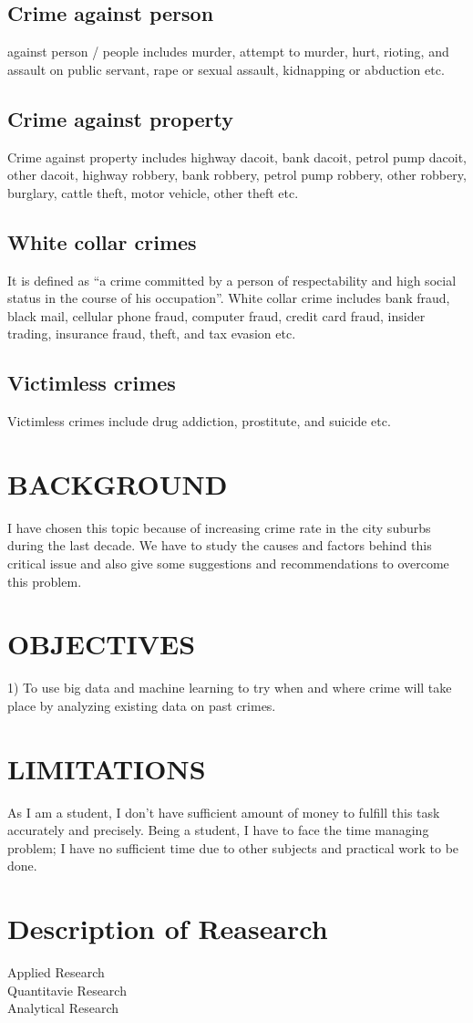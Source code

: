 \documentclass{article}
\begin{document}
\subsection {Crime against person}
against person / people includes murder, attempt to murder, hurt, rioting, and assault on public servant, rape or sexual assault, kidnapping or abduction etc. 
 
\subsection {Crime against property}
Crime against property includes highway dacoit, bank dacoit, petrol pump dacoit, other dacoit, highway robbery, bank robbery, petrol pump robbery, other robbery, burglary, cattle theft, motor vehicle, other theft etc. 
 
\subsection {White collar crimes} 
It is defined as “a crime committed by a person of respectability and high social status in the course 
of his occupation”. 
  White collar crime includes bank fraud, black mail, cellular phone fraud, computer fraud, credit card fraud, insider trading, insurance fraud, theft, and tax evasion etc. 

\subsection {Victimless crimes}
Victimless crimes include drug addiction, prostitute, and suicide etc. 


\section{BACKGROUND} 
I have chosen this topic because of increasing crime rate in the city suburbs during the last decade. We have to study the causes and factors behind this critical issue and also give some suggestions and recommendations to overcome this problem.

\section{OBJECTIVES}
1)	To use big data and machine learning to try when and where crime will take place by analyzing existing data on past crimes.


\section{LIMITATIONS}
As I am a student, I don’t have sufficient amount of money to fulfill this task accurately and precisely. Being a student, I have to face the time managing problem; I have no sufficient time due to other subjects and practical work to be done.

\section{Description of Reasearch}
Applied Research\\
Quantitavie Research\\
Analytical Research
\end{document}
